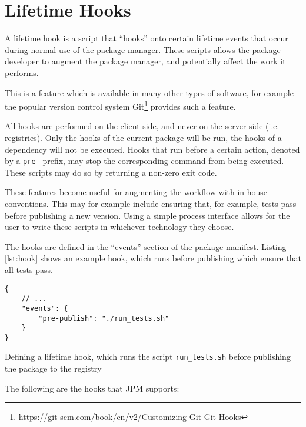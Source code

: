 \section{Lifetime Hooks}
\label{sec:lifetime_hooks}

A lifetime hook is a script that ``hooks'' onto certain lifetime events that
occur during normal use of the package manager. These scripts allows the
package developer to augment the package manager, and potentially affect the
work it performs.

This is a feature which is available in many other types of software, for
example the popular version control system
Git\footnote{\url{https://git-scm.com/book/en/v2/Customizing-Git-Git-Hooks}}
provides such a feature.

All hooks are performed on the client-side, and never on the server side (i.e.
registries). Only the hooks of the current package will be run, the
hooks of a dependency will not be executed. Hooks that run before a certain
action, denoted by a \verb!pre-! prefix, may stop the corresponding command
from being executed.  These scripts may do so by returning a non-zero exit
code.

These features become useful for augmenting the workflow with in-house
conventions. This may for example include ensuring that, for example, tests
pass before publishing a new version. Using a simple process interface allows
for the user to write these scripts in whichever technology they choose.

The hooks are defined in the ``events'' section of the package manifest.
Listing \ref{lst:hook} shows an example hook, which runs before publishing
which ensure that all tests pass.

\begin{listing}[H]
\begin{verbatim}
{
    // ...
    "events": {
        "pre-publish": "./run_tests.sh"
    }
}
\end{verbatim}

\caption{Defining a lifetime hook, which runs the script
    \texttt{run_tests.sh} before publishing the package to the
        registry}

\label{lst:hook}

\end{listing}

The following are the hooks that JPM supports:

